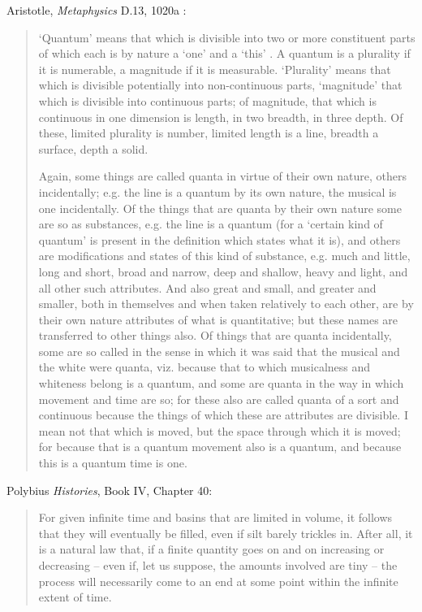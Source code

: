 \documentclass{article}
\begin{document}
Aristotle, {\em Metaphysics} \textgreek{D.13}, 1020a \cite{metaphysica}:

\begin{quote}
`Quantum' means that which is divisible into two or more constituent parts of which each is by nature a `one'
and a `this' . A quantum is a plurality if it is numerable,
a magnitude if it is measurable. `Plurality' means that which is divisible potentially into non-continuous parts,
`magnitude' that which is divisible into continuous parts; of magnitude, that which is continuous in one dimension is length, in two breadth, in three depth. Of these, limited plurality is number, limited length is a line, breadth a surface, depth a solid.

Again, some things are called quanta in virtue of their
own nature, others incidentally; e.g. the line is a quantum by its own nature, the musical is one incidentally. Of the things that are quanta by their own nature some are so as 
substances, e.g. the line is a quantum (for a `certain kind of quantum' is present in the definition which states what it is), and others are modifications and states of this kind of substance, e.g. much and little, long and short, broad and 
narrow, deep and shallow, heavy and light, and all other such attributes. And also great and small, and greater and smaller, both in themselves and when taken relatively to each other, are by their own nature attributes of what is quantitative; but these names are transferred to other things also. Of things that are quanta incidentally, some are so called in
the sense in which it was said that the musical and the white were quanta, viz. because that to which musicalness and whiteness belong is a quantum, and some are quanta in the way in which movement and time are so; for these also are
called quanta of a sort and continuous because the things of which these are attributes are divisible. I mean not that which is moved, but the space through which it is moved; for because that is a quantum movement also is a quantum, and because this is a quantum time is one.
\end{quote}

Polybius {\em Histories}, Book IV, Chapter 40:

\begin{quote}
For given infinite time and basins that are limited in volume,
it follows that they will eventually be filled, even if silt barely trickles in. After all, it is a natural law that,
if a finite quantity goes on and on increasing or decreasing -- even if, let us suppose, the amounts involved
are tiny -- the process will necessarily come to an end at some point within the infinite extent of time.
\end{quote}
\end{document}
